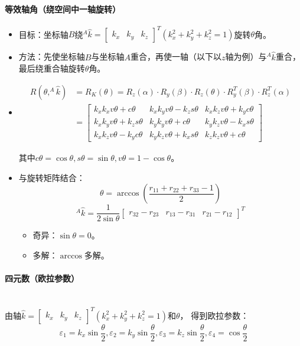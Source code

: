 \documentclass[
12pt, %
a4paper, 
oneside, %
headinclude,footinclude, %
]{scrartcl}
\begin{document}
\paragraph{等效轴角（绕空间中一轴旋转）}
\begin{itemize}
\item 目标：坐标轴$ B $绕$ ^A \hat{k} = \begin{bmatrix} k_x & k_y & k_z \end{bmatrix}^T(k_x^2 + k_y^2 + k_z^2 = 1) $旋转$ \theta $角。
\item 方法：先使坐标轴$ B $与坐标轴$ A $重合，再使一轴（以下以$ z $轴为例）与$ ^A \hat{k} $重合，最后绕重合轴旋转$ \theta $角。
\item 
\begin{align*}
R(\theta, ^A \hat{k}) &= R_K(\theta) = R_z(\alpha) \cdot R_y(\beta) \cdot R_z(\theta) \cdot R_y^T(\beta) \cdot R_z^T(\alpha) \\
&= \begin{bmatrix}
k_x k_x v\theta + c\theta & k_x k_y v\theta - k_z s\theta & k_x k_z v\theta + k_y c\theta \\
k_x k_y v\theta + k_z s\theta & k_y k_y v\theta + c\theta & k_y k_z v\theta - k_x s\theta \\
k_x k_z v\theta - k_y c\theta & k_y k_z v\theta + k_x s\theta & k_z k_z v\theta + c\theta
\end{bmatrix} 
\end{align*}

其中$c\theta = \cos\theta, s\theta = \sin\theta, v\theta = 1 - \cos\theta$。
\item 与旋转矩阵结合：
$$ \theta = \arccos(\frac{r_{11} + r_{22} + r_{33} - 1}{2}) $$
$$ ^A \hat{k} = \frac{1}{2 \sin θ} \begin{bmatrix} r_{32} - r_{23} & r_{13} - r_{31} & r_{21} - r_{12} \end{bmatrix}^T $$
\begin{itemize}
\item 奇异：$ \sin\theta = 0 $。
\item 多解：$ \arccos $多解。
\end{itemize}
\end{itemize}
\paragraph{四元数（欧拉参数）}~\\

由轴$ \hat{k} = \begin{bmatrix} k_x & k_y & k_z \end{bmatrix}^T(k_x^2 + k_y^2 + k_z^2 = 1) $和$ \theta $，
得到欧拉参数：$$ \varepsilon_1 = k_x \sin\frac{\theta}{2}, \varepsilon_2 = k_y \sin\frac{\theta}{2}, \varepsilon_3 = k_z \sin\frac{\theta}{2}, \varepsilon_4 = \cos\frac{\theta}{2} $$
\end{document}
